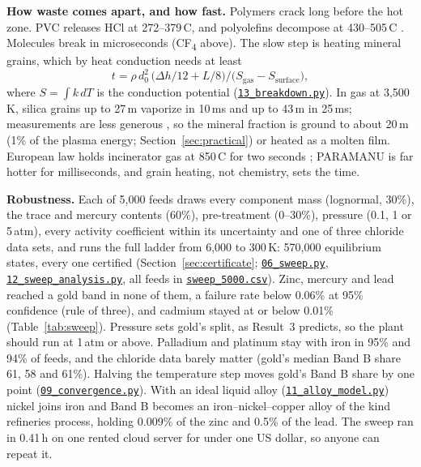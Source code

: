 \documentclass[11pt,a4paper]{article}
\newcommand{\gh}[2]{\href{https://github.com/syncaissa/paramanu-reclaimer/blob/main/#1}{\texttt{#2}}}
\theoremstyle{definition}
\theoremstyle{plain}
\theoremstyle{remark}
\begin{document}
\textbf{How waste comes apart, and how fast.} Polymers crack long before the hot zone. PVC releases HCl at 272--379\,\textdegree C, and polyolefins decompose at 430--505\,\textdegree C \citep{yuan2020}. Molecules break in microseconds (CF\textsubscript{4} above). The slow step is heating mineral grains, which by heat conduction needs at least
\begin{equation}\label{eq:vaptime}
t = \rho\, d_0^2\,\big(\Delta h/12 + L/8\big)\big/\big(S_{\mathrm{gas}} - S_{\mathrm{surface}}\big),
\end{equation}
where $S = \int k\,dT$ is the conduction potential \citep{chen1988} (\gh{simulation/scripts/13_breakdown.py}{13\_breakdown.py}). In gas at 3,500\,K, silica grains up to 27\,\textmu m vaporize in 10\,ms and up to 43\,\textmu m in 25\,ms; measurements are less generous \citep{gitzhofer1996}, so the mineral fraction is ground to about 20\,\textmu m (1\% of the plasma energy; Section~\ref{sec:practical}) or heated as a molten film. European law holds incinerator gas at 850\,\textdegree C for two seconds \citep{eu2010ied}; PARAMANU is far hotter for milliseconds, and grain heating, not chemistry, sets the time.

\textbf{Robustness.} Each of 5,000 feeds draws every component mass (lognormal, 30\%), the trace and mercury contents (60\%), pre-treatment (0--30\%), pressure (0.1, 1 or 5\,atm), every activity coefficient within its uncertainty and one of three chloride data sets, and runs the full ladder from 6,000 to 300\,K: 570,000 equilibrium states, every one certified (Section~\ref{sec:certificate}; \gh{simulation/scripts/06_sweep.py}{06\_sweep.py}, \gh{simulation/scripts/12_sweep_analysis.py}{12\_sweep\_analysis.py}, all feeds in \gh{simulation/results/sweep_5000.csv}{sweep\_5000.csv}). Zinc, mercury and lead reached a gold band in none of them, a failure rate below 0.06\% at 95\% confidence (rule of three), and cadmium stayed at or below 0.01\% (Table~\ref{tab:sweep}). Pressure sets gold's split, as Result~3 predicts, so the plant should run at 1\,atm or above. Palladium and platinum stay with iron in 95\% and 94\% of feeds, and the chloride data barely matter (gold's median Band B share 61, 58 and 61\%). Halving the temperature step moves gold's Band B share by one point (\gh{simulation/scripts/09_convergence.py}{09\_convergence.py}). With an ideal liquid alloy (\gh{simulation/scripts/11_alloy_model.py}{11\_alloy\_model.py}) nickel joins iron and Band B becomes an iron--nickel--copper alloy of the kind refineries process, holding 0.009\% of the zinc and 0.5\% of the lead. The sweep ran in 0.41\,h on one rented cloud server for under one US dollar, so anyone can repeat it.
\end{document}
